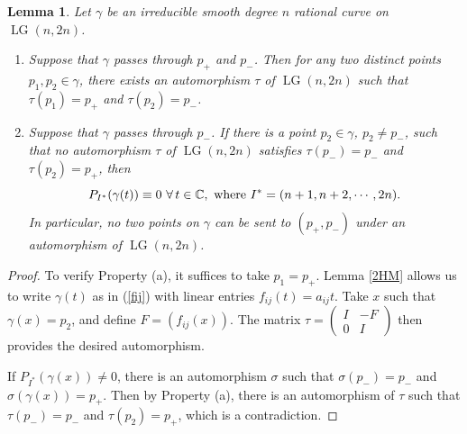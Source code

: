 \documentclass[10pt]{amsart}
\newtheorem{lemma}[theorem]{Lemma}
\theoremstyle{definition}
\newcommand{\LG}{\operatorname{LG}}
\theoremstyle{plain} %
\begin{document}
\begin{lemma}\label{gspp}
Let $\gamma$ be an irreducible smooth degree $n$ rational curve on $\LG(n,2n)$.
\begin{enumerate}[label=(\alph*)]
    \item Suppose that $\gamma$ passes through $p_+$ and $p_-$. Then for any two distinct points  $p_1,p_2\in\gamma$, there exists an automorphism $\tau$ of $\LG(n,2n)$ such that $\tau(p_1)=p_+$ and $\tau(p_2)=p_-$. 

    \item Suppose that $\gamma$ passes through $p_-$. If there is a point $p_2\in\gamma$, $p_2\neq p_-$, such that no automorphism $\tau$ of $\LG(n,2n)$ satisfies $\tau(p_-)=p_-$ and $\tau(p_2)=p_+$,  then 
\begin{equation}\label{vanishing}
P_{I^*}(\gamma(t))\equiv0\,\,\forall\,t\in\mathbb C,\,\,{\rm where}\,\,I^*=(n+1,n+2,\cdots,2n).
\end{equation}
In particular, no two points on $\gamma$ can be sent to $(p_+,p_-)$ under an automorphism of $\LG(n,2n)$.
\end{enumerate}

\end{lemma}
\begin{proof} To verify Property (a), it suffices to take $p_1=p_+$. Lemma \ref{2HM} allows us to write $\gamma(t)$ as in (\ref{fij}) with linear entries $f_{ij}(t)=a_{ij}t$. Take $x$ such that $\gamma(x)=p_2$, and define $F=(f_{ij}(x))$. The matrix $\tau=\begin{pmatrix}
        I&-F\\
        0&I
    \end{pmatrix}$
then provides the desired automorphism.

If $P_{I^*}(\gamma(x))\neq0$, there is an automorphism $\sigma$ such that $\sigma(p_-)=p_-$ and $\sigma(\gamma(x))=p_+$. Then by Property (a), there is an automorphism of $\tau$ such that $\tau(p_-)=p_-$ and $\tau(p_2)=p_+$, which is a contradiction.
\end{proof}
\end{document}
